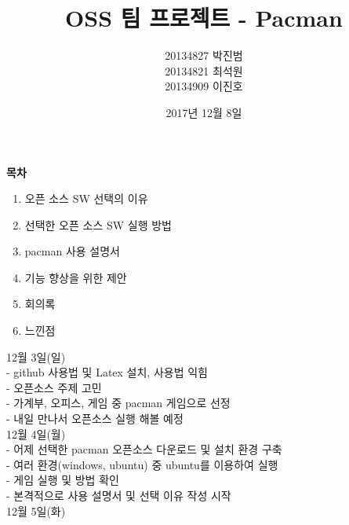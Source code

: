 \documentclass{article}
\begin{document}
\title{\textbf{OSS 팀 프로젝트 - Pacman}}
\author {20134827 박진범\\20134821 최석원\\20134909 이진호}
\date{2017년 12월 8일}
\maketitle



\newpage
\begin{huge}\begin{center}\textbf{목차\\}\end{center}\end{huge}

\begin{enumerate}

\item 오픈 소스 SW 선택의 이유
\item 선택한 오픈 소스 SW 실행 방법
\item pacman 사용 설명서
\item 기능 향상을 위한 제안
\item 회의록 
\item 느낀점 


\end{enumerate}

\newpage
12월 3일(일)\\

- github 사용법 및 Latex 설치, 사용법 익힘\\

- 오픈소스 주제 고민\\

- 가계부, 오피스, 게임 중 pacman 게임으로 선정\\

- 내일 만나서 오픈소스 실행 해볼 예정\\


12월 4일(월)\\

- 어제 선택한 pacman 오픈소스 다운로드 및 설치 환경 구축\\

- 여러 환경(windows, ubuntu) 중 ubuntu를 이용하여 실행\\

- 게임 실행 및 방법 확인\\

- 본격적으로 사용 설명서 및 선택 이유 작성 시작\\

12월 5일(화)\\
 
\end{document}
